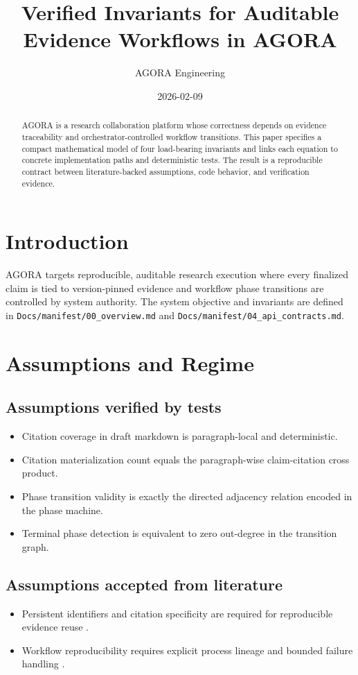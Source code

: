 \documentclass[11pt]{article}
\title{Verified Invariants for Auditable Evidence Workflows in AGORA}
\author{AGORA Engineering}
\date{2026-02-09}
\begin{document}
\maketitle

\begin{abstract}
AGORA is a research collaboration platform whose correctness depends on evidence traceability and orchestrator-controlled workflow transitions. This paper specifies a compact mathematical model of four load-bearing invariants and links each equation to concrete implementation paths and deterministic tests. The result is a reproducible contract between literature-backed assumptions, code behavior, and verification evidence.
\end{abstract}

\section{Introduction}
AGORA targets reproducible, auditable research execution where every finalized claim is tied to version-pinned evidence and workflow phase transitions are controlled by system authority. The system objective and invariants are defined in \texttt{Docs/manifest/00\_overview.md} and \texttt{Docs/manifest/04_api_contracts.md}.

\section{Assumptions and Regime}\label{sec:assumptions_regime}
\subsection*{Assumptions verified by tests}
\begin{itemize}
  \item Citation coverage in draft markdown is paragraph-local and deterministic.
  \item Citation materialization count equals the paragraph-wise claim-citation cross product.
  \item Phase transition validity is exactly the directed adjacency relation encoded in the phase machine.
  \item Terminal phase detection is equivalent to zero out-degree in the transition graph.
\end{itemize}

\subsection*{Assumptions accepted from literature}
\begin{itemize}
  \item Persistent identifiers and citation specificity are required for reproducible evidence reuse \cite{wilkinson2016fair,datacite2014principles,smith2016software}.
  \item Workflow reproducibility requires explicit process lineage and bounded failure handling \cite{simmhan2005provenance,deelman2015pegasus}.
\end{itemize}
\end{document}
